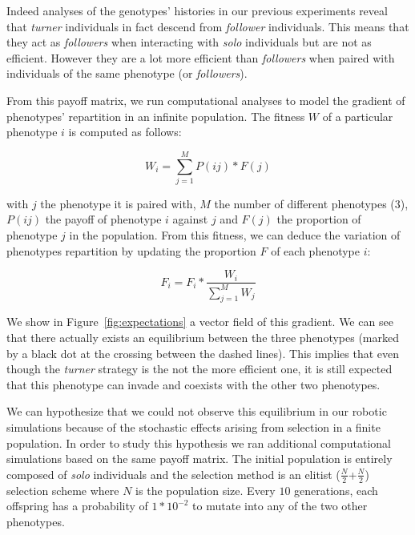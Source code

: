       Indeed analyses of the genotypes' histories in our previous experiments reveal that \emph{turner} individuals in fact descend from \emph{follower} individuals. This means that they act as \emph{followers} when interacting with \emph{solo} individuals but are not as efficient. However they are a lot more efficient than \emph{followers} when paired with individuals of the same phenotype (or \emph{followers}).


      From this payoff matrix, we run computational analyses to model the gradient of phenotypes' repartition in an infinite population. The fitness \(W\) of a particular phenotype \(i\) is computed as follows:

      \[
        W_{i} = \sum_{j=1}^{M} P(ij)*F(j)
      \]

      with \(j\) the phenotype it is paired with, \(M\) the number of different phenotypes ($3$), \(P(ij)\) the payoff of phenotype \(i\) against \(j\) and \(F(j)\) the proportion of phenotype \(j\) in the population. From this fitness, we can deduce the variation of phenotypes repartition by updating the proportion \(F\) of each phenotype \(i\): 

      \[
        F_{i} = F_{i}*\frac{W_{i}}{\sum_{j=1}^{M} W_{j}}
      \]

      We show in Figure~\ref{fig:expectations} a vector field of this gradient. We can see that there actually exists an equilibrium between the three phenotypes (marked by a black dot at the crossing between the dashed lines). This implies that even though the \emph{turner} strategy is the not the more efficient one, it is still expected that this phenotype can invade and coexists with the other two phenotypes.

      We can hypothesize that we could not observe this equilibrium in our robotic simulations because of the stochastic effects arising from selection in a finite population. In order to study this hypothesis we ran additional computational simulations based on the same payoff matrix. The initial population is entirely composed of \emph{solo} individuals and the selection method is an elitist (\(\frac{N}{2}\)+\(\frac{N}{2}\)) selection scheme where \(N\) is the population size. Every $10$ generations, each offspring has a probability of \(1*10^{-2}\) to mutate into any of the two other phenotypes.

